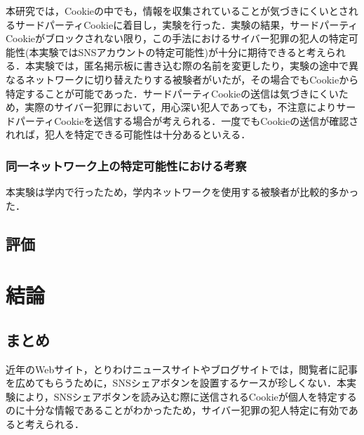 \documentclass[10pt, a4paper]{jreport}
\begin{document}
本研究では，Cookieの中でも，情報を収集されていることが気づきにくいとされるサードパーティCookieに着目し，実験を行った．実験の結果，サードパーティCookieがブロックされない限り，この手法におけるサイバー犯罪の犯人の特定可能性(本実験ではSNSアカウントの特定可能性)が十分に期待できると考えられる．本実験では，匿名掲示板に書き込む際の名前を変更したり，実験の途中で異なるネットワークに切り替えたりする被験者がいたが，その場合でもCookieから特定することが可能であった．サードパーティCookieの送信は気づきにくいため，実際のサイバー犯罪において，用心深い犯人であっても，不注意によりサードパーティCookieを送信する場合が考えられる．一度でもCookieの送信が確認されれば，犯人を特定できる可能性は十分あるといえる．

\subsection{同一ネットワーク上の特定可能性における考察}
本実験は学内で行ったため，学内ネットワークを使用する被験者が比較的多かった．

\section{評価}






















\chapter{結論}
\section{まとめ}
近年のWebサイト，とりわけニュースサイトやブログサイトでは，閲覧者に記事を広めてもらうために，SNSシェアボタンを設置するケースが珍しくない．本実験により，SNSシェアボタンを読み込む際に送信されるCookieが個人を特定するのに十分な情報であることがわかったため，サイバー犯罪の犯人特定に有効であると考えられる．
\end{document}
